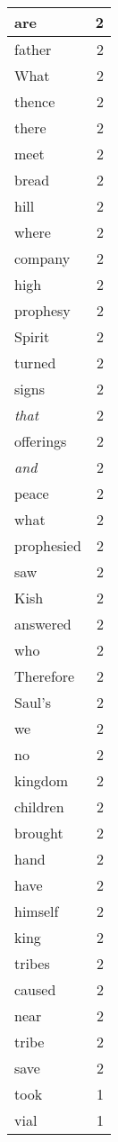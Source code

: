 \begin{center}
\begin{longtable}{l|r}
are & 2 \\ \hline
father & 2 \\ \hline
What & 2 \\ \hline
thence & 2 \\ \hline
there & 2 \\ \hline
meet & 2 \\ \hline
bread & 2 \\ \hline
hill & 2 \\ \hline
where & 2 \\ \hline
company & 2 \\ \hline
high & 2 \\ \hline
prophesy & 2 \\ \hline
Spirit & 2 \\ \hline
turned & 2 \\ \hline
signs & 2 \\ \hline
\emph{that} & 2 \\ \hline
offerings & 2 \\ \hline
\emph{and} & 2 \\ \hline
peace & 2 \\ \hline
what & 2 \\ \hline
prophesied & 2 \\ \hline
saw & 2 \\ \hline
Kish & 2 \\ \hline
answered & 2 \\ \hline
who & 2 \\ \hline
Therefore & 2 \\ \hline
Saul's & 2 \\ \hline
we & 2 \\ \hline
no & 2 \\ \hline
kingdom & 2 \\ \hline
children & 2 \\ \hline
brought & 2 \\ \hline
hand & 2 \\ \hline
have & 2 \\ \hline
himself & 2 \\ \hline
king & 2 \\ \hline
tribes & 2 \\ \hline
caused & 2 \\ \hline
near & 2 \\ \hline
tribe & 2 \\ \hline
save & 2 \\ \hline
took & 1 \\ \hline
vial & 1 \\ \hline

\end{longtable}
\end{center}
